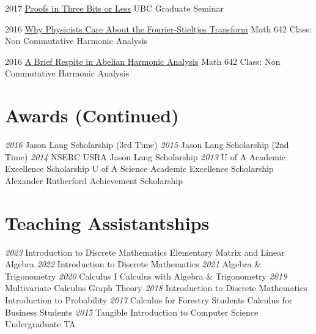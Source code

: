 \documentclass[a4paper]{cv-friggeri}
\begin{document}
\begin{entrylist}

\entry
{2017}
{\href{https://github.com/jdjake/Notes/raw/master/Talks/TalkNotes/ProofsInThreeBits.pdf}{Proofs in Three Bits or Less}}
{}
{UBC Graduate Seminar}

\entry
{2016}
{\href{https://github.com/jdjake/Notes/raw/master/Talks/TalkNotes/FourierStieltjes.pdf}{Why Physicists Care About the Fourier-Stieltjes Transform}}
{}
{Math 642 Class: Non Commutative Harmonic Analysis}

\entry
{2016}
{\href{https://github.com/jdjake/Notes/raw/master/Talks/TalkNotes/PontrayaginDuality.pdf}{A Brief Respite in Abelian Harmonic Analysis}}
{}
{Math 642 Class: Non Commutative Harmonic Analysis}

\end{entrylist}

\begin{asidenotit}
\section{Awards (Continued)}
\emph{2016}
Jason Lang Scholarship
(3rd Time)
\emph{2015}
Jason Lang Scholarship
(2nd Time)
\emph{2014}
NSERC USRA
Jason Lang Scholarship
\emph{2013}
U of A Academic Excellence Scholarship
U of A Science Academic Excellence Scholarship
Alexander Rutherford Achievement Scholarship
~
\section{Teaching Assistantships}
\emph{2023}
Introduction to Discrete Mathematics
Elementary Matrix and Linear Algebra
\emph{2022}
Introduction to Discrete Mathematics
\emph{2021}
Algebra \& Trigonometry
\emph{2020}
Calculus I
Calculus with Algebra \& Trigonometry
\emph{2019}
Multivariate Calculus
Graph Theory
\emph{2018}
Introduction to Discrete Mathematics
Introduction to Probability
\emph{2017}
Calculus for Forestry Students
Calculus for Business Students
\emph{2015}
Tangible Introduction to Computer Science Undergraduate TA
\end{asidenotit}
\end{document}
